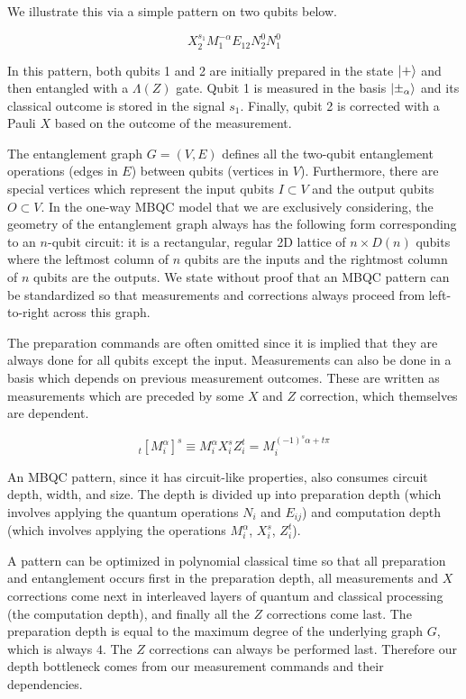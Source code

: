We illustrate this via a simple pattern on two qubits below.

\begin{equation}
X^{s_1}_2 M^{-\alpha}_1 E_{12} N^{0}_2 N^{0}_1
\end{equation}

In this pattern, both qubits 1 and 2 are initially prepared in the
state $\left\vert{+}\right\rangle$ and then entangled with a $\Lambda(Z)$ gate.
Qubit 1 is measured in the basis $\left\vert{\pm_{\alpha}}\right\rangle$ and its
classical outcome is stored in the signal $s_1$. Finally,
qubit 2 is corrected with a Pauli $X$ based on the outcome of
the measurement.

The entanglement graph $G = (V,E)$ defines all the two-qubit entanglement
operations (edges in $E$) between qubits (vertices in $V$). Furthermore,
there are special vertices which represent the input
qubits $I \subset V$ and the output qubits $O \subset V$. In the one-way
MBQC model that we are exclusively considering,
the geometry of the entanglement graph always has the following form
corresponding to an $n$-qubit circuit: it is a
rectangular, regular 2D lattice of $n \times D(n)$ qubits where the
leftmost column of $n$ qubits are the inputs and the rightmost
column of $n$ qubits are the outputs. We state without proof that an
MBQC pattern can be standardized so that measurements and corrections
always proceed from left-to-right across this graph.

The preparation commands are often omitted since it is implied that they
are always done for all qubits except the input.
Measurements can also be done in a basis which depends on previous
measurement outcomes. These are written as measurements which are
preceded by some $X$ and $Z$ correction, which themselves are dependent.

\begin{equation}
_t\left[M^{\alpha}_i\right]^s \equiv M^{\alpha}_i X^s_i Z^t_i =
M_i^{(-1)^s \alpha + t\pi}
\end{equation}

An MBQC pattern, since it has circuit-like properties, also consumes
circuit depth, width, and size. The depth is divided up into
preparation depth (which involves applying the quantum operations
$N_i$ and $E_{ij}$) and computation depth (which involves applying
the operations $M^{\alpha}_i$, $X^{s}_i$, $Z^{t}_i$).

A pattern can be optimized in polynomial classical time so that
all preparation and entanglement occurs first in the preparation depth,
all measurements and $X$ corrections come next in interleaved layers of
quantum and classical processing (the computation depth),
and finally all the $Z$ corrections come
last. The preparation depth is equal to the maximum degree of the
underlying graph $G$, which is always $4$. The $Z$ corrections can
always be performed last.
Therefore our depth bottleneck
comes from our measurement commands and their dependencies.

